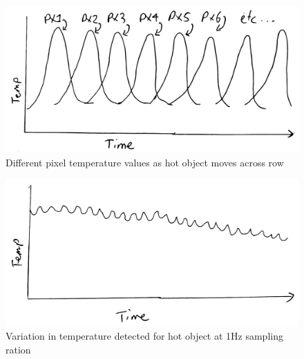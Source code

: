\documentclass[../thesis/thesis.tex]{subfiles}
\begin{document}
\begin{figure}
\centering
\includegraphics[width=\textwidth]{../diagrams/temp/motion.pdf}
\caption{Different \mlx pixel temperature values as hot object moves across row}
\label{fig:hotmotion}
\end{figure}

\begin{figure}
\centering
\includegraphics[width=\textwidth]{../diagrams/temp/cooldown.pdf}
\caption{Variation in temperature detected for hot object at 1Hz sampling ration}
\label{fig:cooldown}
\end{figure}
 
\end{document}
